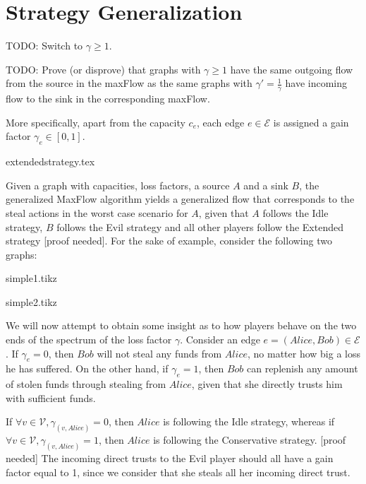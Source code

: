 \section{Strategy Generalization}
  TODO: Switch to $\gamma \geq 1$.

  TODO: Prove (or disprove) that graphs with $\gamma \geq 1$ have the same outgoing flow from the source in the maxFlow as the
  same graphs with $\gamma' = \frac{1}{\gamma}$ have incoming flow to the sink in the corresponding maxFlow.

  More specifically, apart from the capacity $c_e$, each edge $e \in \mathcal{E}$ is assigned a gain factor $\gamma_e \in
  \left[0, 1\right]$. 
  
  {extendedstrategy.tex}

  Given a graph with capacities, loss factors, a source $A$ and a sink $B$, the generalized MaxFlow algorithm yields a
  generalized flow that corresponds to the steal actions in the worst case scenario for $A$, given that $A$ follows the Idle
  strategy, $B$ follows the Evil strategy and all other players follow the Extended strategy [proof needed]. For the sake of
  example, consider the following two graphs:
  
  {simple1.tikz}

  {simple2.tikz}

  We will now attempt to obtain some insight as to how players behave on the two ends of the spectrum of the loss factor
  $\gamma$. Consider an edge $e = \left(Alice, Bob\right) \in \mathcal{E}$. If $\gamma_e = 0$, then $Bob$ will not steal any
  funds from $Alice$, no matter how big a loss he has suffered. On the other hand, if $\gamma_e = 1$, then $Bob$ can replenish
  any amount of stolen funds through stealing from $Alice$, given that she directly trusts him with sufficient funds.
  
  If $\forall v \in \mathcal{V}, \gamma_{\left(v, Alice\right)} = 0$, then $Alice$ is following the Idle strategy, whereas if
  $\forall v \in \mathcal{V}, \gamma_{\left(v, Alice\right)} = 1$, then $Alice$ is following the Conservative strategy. [proof
  needed] The incoming direct trusts to the Evil player should all have a gain factor equal to 1, since we consider that she
  steals all her incoming direct trust.
